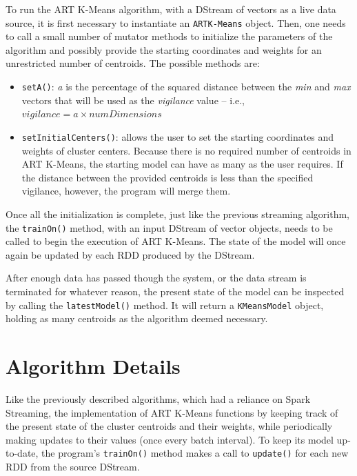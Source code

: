 \documentclass{l4proj}
\begin{document}
To run the ART K-Means algorithm, with a DStream of vectors as a live data source, it is first necessary to instantiate an \texttt{ARTK-Means} object. Then, one needs to call a small number of mutator methods to initialize the parameters of the algorithm and possibly provide the starting coordinates and weights for an unrestricted number of centroids. The possible methods are:

\begin{itemize}
\item \texttt{setA()}: \textit{a} is the percentage of the squared distance between the \textit{min} and \textit{max} vectors that will be used as the \textit{vigilance} value -- i.e., $vigilance = a \times numDimensions$
\item \texttt{setInitialCenters()}: allows the user to set the starting coordinates and weights of cluster centers. Because there is no required number of centroids in ART K-Means, the starting model can have as many as the user requires. If the distance between the provided centroids is less than the specified vigilance, however, the program will merge them.
\end{itemize}

Once all the initialization is complete, just like the previous streaming algorithm, the \texttt{trainOn()} method, with an input DStream of vector objects, needs to be called to begin the execution of ART K-Means. The state of the model will once again be updated by each RDD produced by the DStream.

After enough data has passed though the system, or the data stream is terminated for whatever reason, the present state of the model can be inspected by calling the \texttt{latestModel()} method. It will return a \texttt{KMeansModel} object, holding as many centroids as the algorithm deemed necessary.

\section{Algorithm Details}

Like the previously described algorithms, which had a reliance on Spark Streaming, the implementation of ART K-Means functions by keeping track of the present state of the cluster centroids and their weights, while periodically making updates to their values (once every batch interval). To keep its model up-to-date, the program's \texttt{trainOn()} method makes a call to \texttt{update()} for each new RDD from the source DStream. 
\end{document}
